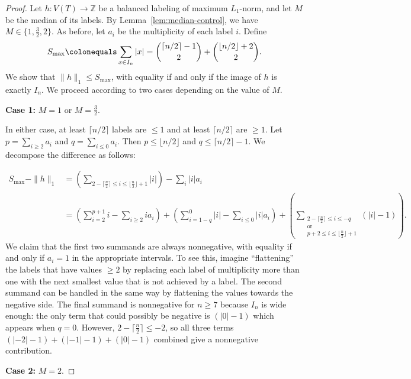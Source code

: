 \documentclass[12pt,reqno]{amsart}
\theoremstyle{definition}
\begin{document}
\begin{proof}

Let $h\colon V(T)\to \mathbb{Z}$ be a balanced labeling of maximum $L_1$-norm, and let $M$ be the median of its labels. By Lemma~\ref{lem:median-control}, we have $M\in \{1, \frac{3}{2}, 2\}$. As before, let $a_i$ be the multiplicity of each label $i$. Define 
\[
S_{\max} \colonequals \sum_{x\in I_n} |x| = \binom{\lceil n/2\rceil -1}{2} + \binom{\lfloor n/2\rfloor+2}{2}.
\]
We show that $\|h\|_1 \le S_{\max}$, with equality if and only if the image of $h$ is exactly $I_n$. We proceed according to two cases depending on the value of $M$.

\textbf{Case 1:} $M=1$ or $M=\frac{3}{2}$.

In either case, at least $\lceil n/2\rceil$ labels are $\le 1$ and at least $\lceil n/2\rceil$ are $\ge 1$. Let $p = \sum_{i\ge 2} a_i$ and $q = \sum_{i\le 0} a_i$. Then $p \le \lfloor n/2 \rfloor$ and $q \le \lceil n/2 \rceil - 1$. We decompose the difference as follows:

\begin{align*}
S_{\max}-\|h\|_1&=\left(\sum_{2-\lceil \frac{n}{2}\rceil\le i\le \lfloor\frac{n}{2}\rfloor+1}|i|\right)-\sum_{i}|i|a_i  \\
&=\left(\sum_{i=2}^{p+1} i-\sum_{i\geq 2}ia_i \right)+\left(\sum_{i=1-q}^{0} |i|-\sum_{i\le 0}|i|a_i \right)+\left(\sum_{\substack{2-\lceil \frac{n}{2}\rceil\le i\le -q \\ 
\text{or} \\
p+2\le i\le \lfloor\frac{n}{2}\rfloor+1}} (|i|-1) \right).
\end{align*}
 We claim that the first two summands are always nonnegative, with equality if and only if $a_i=1$ in the appropriate intervals. To see this, imagine ``flattening'' the labels that have values $\geq 2$ by replacing each label of multiplicity more than one with the next smallest value that is not achieved by a label. The second summand can be handled in the same way by flattening the values towards the negative side. The final summand is nonnegative for $n\geq 7$ because $I_n$ is wide enough: the only term that could possibly be negative is $(|0|-1)$ which appears when $q=0$. However, $2-\lceil\frac{n}{2}\rceil\le -2$, so all three terms $(|-2|-1)+(|-1|-1)+(|0|-1)$ combined give a nonnegative contribution. 
 
\textbf{Case 2:} $M=2$.


\end{proof}
\end{document}
